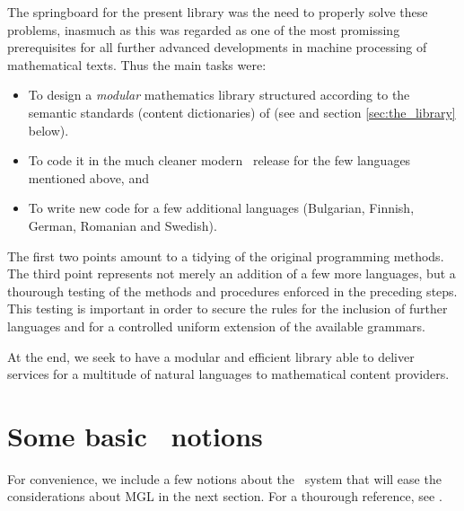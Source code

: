 \documentclass[adraft,copyright,creativecommons]{eptcs}
\begin{document}
The springboard for the present library was the need to properly solve
these problems, inasmuch as this was regarded as one of the most promissing
prerequisites for all further advanced developments in machine processing
of mathematical texts.  Thus the main tasks were:
\begin{itemize}
\item
To design a \emph{modular} mathematics library structured according to
the semantic standards (content dictionaries) of \openmath{}
(see \cite{OpenMath} and section \ref{sec:the_library} below).
\item
To code it in the much cleaner modern \GF\ release for the few languages
mentioned above, and
\item
To write new code for a few additional languages (Bulgarian, Finnish,
German, Romanian and Swedish).
\end{itemize}
The first two points amount to a tidying of the original \webalt{}
programming methods. The third point represents not merely an addition
of a few more languages, but a thourough testing of the methods and
procedures enforced in the preceding steps. This testing is important in
order to secure the rules for the inclusion of further languages and for
a controlled uniform extension of the available grammars.

At the end, we seek to have a modular and efficient library able
to deliver services for a multitude of natural languages to mathematical content providers.


\section{Some basic \GF\ notions}

For convenience, we include a few notions about the \GF\ 
system that will ease the considerations about MGL in the next section.
For a thourough reference, see \cite{Ranta11}.
\end{document}

